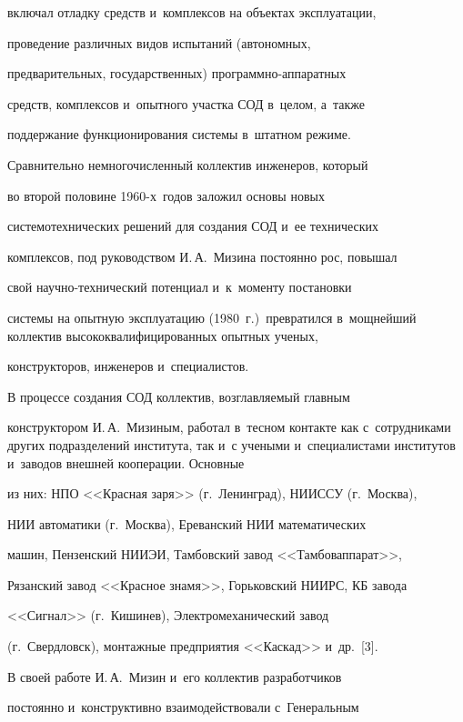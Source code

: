 включал отладку средств и~комплексов на объектах эксплуатации,


проведение различных видов испытаний (автономных,


предварительных, государственных) про\-грам\-мно-ап\-па\-рат\-ных


средств, комплексов и~опытного участка СОД в~целом, а~также


поддержание функционирования системы в~штатном режиме.





    Сравнительно немногочисленный коллектив инженеров, который


во второй половине 1960-х~годов заложил основы новых


системотехнических решений для создания СОД и~ее технических


комплексов, под руководством И.\,А.~Мизина постоянно рос, повышал


свой на\-уч\-но-тех\-ни\-че\-ский потенциал и~к~моменту постановки


системы на опытную эксплуатацию (1980~г.)\ превратился в~мощнейший коллектив высококвалифицированных опытных ученых,


конструкторов, инженеров и~специалистов.





    В процессе создания СОД коллектив, возглавляемый главным


конструктором И.\,А.~Мизиным, работал в~тесном контакте как с~сотрудниками других подразделений института, так и~с учеными и~специалистами институтов и~заводов внешней кооперации. Основные


из них: НПО <<Красная заря>> (г.~Ленинград), НИИССУ (г.~Москва),


НИИ автоматики (г.~Москва), Ереванский НИИ математических


машин, Пензенский НИИЭИ, Тамбовский завод <<Тамбоваппарат>>,


Рязанский завод <<Красное знамя>>, Горьковский НИИРС, КБ завода


<<Сигнал>> (г.~Кишинев), Электромеханический завод


(г.~Свердловск), монтажные предприятия <<Каскад>> и~др.~[3].





    В своей работе И.\,А.~Мизин и~его коллектив разработчиков


постоянно и~конструктивно взаимодействовали с~Генеральным


